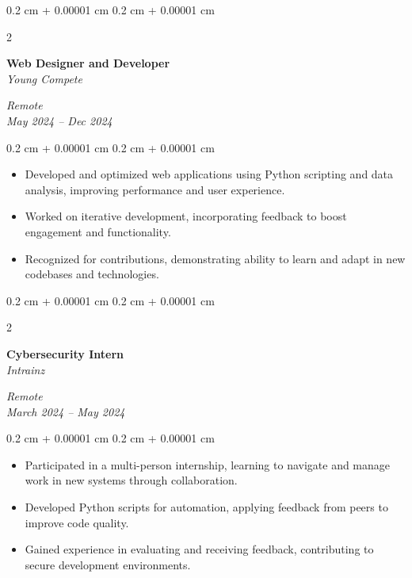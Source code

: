 \documentclass[10pt, letterpaper]{article}
\newenvironment{highlights}{
    \begin{itemize}[
        topsep=0.10 cm,
        parsep=0.10 cm,
        partopsep=0pt,
        itemsep=0pt,
        leftmargin=0.4 cm + 10pt
    ]
}{
    \end{itemize}
} %
\newenvironment{onecolentry}{
    \begin{adjustwidth}{
        0.2 cm + 0.00001 cm
    }{
        0.2 cm + 0.00001 cm
    }
}{
    \end{adjustwidth}
} %
\newenvironment{twocolentry}[2][]{
    \onecolentry
    \def\secondColumn{#2}
    \setcolumnwidth{\fill, 4.5 cm}
    \begin{paracol}{2}
}{
    \switchcolumn \raggedleft \secondColumn
    \end{paracol}
    \endonecolentry
} %
\begin{document}
    \begin{twocolentry}{
        \textit{Remote} \\
        \textit{May 2024 – Dec 2024}
    }
        \textbf{Web Designer and Developer} \\
        \textit{Young Compete}
    \end{twocolentry}
    \vspace{0.10 cm}
    \begin{onecolentry}
        \begin{highlights}
            \item Developed and optimized web applications using Python scripting and data analysis, improving performance and user experience.
            \item Worked on iterative development, incorporating feedback to boost engagement and functionality.
            \item Recognized for contributions, demonstrating ability to learn and adapt in new codebases and technologies.
        \end{highlights}
    \end{onecolentry}
    \vspace{0.2 cm}
    \begin{twocolentry}{
        \textit{Remote} \\
        \textit{March 2024 – May 2024}
    }
        \textbf{Cybersecurity Intern} \\
        \textit{Intrainz}
    \end{twocolentry}
    \vspace{0.10 cm}
    \begin{onecolentry}
        \begin{highlights}
            \item Participated in a multi-person internship, learning to navigate and manage work in new systems through collaboration.
            \item Developed Python scripts for automation, applying feedback from peers to improve code quality.
            \item Gained experience in evaluating and receiving feedback, contributing to secure development environments.
        \end{highlights}
    \end{onecolentry}
\end{document}

